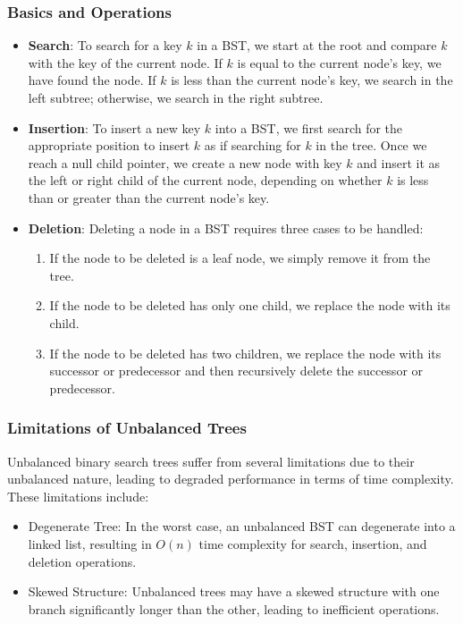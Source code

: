 \documentclass[12pt]{book} %
\begin{document}
\subsubsection{Basics and Operations}
\begin{itemize}
    \item \textbf{Search}: To search for a key \(k\) in a BST, we start at the root and compare \(k\) with the key of the current node. If \(k\) is equal to the current node's key, we have found the node. If \(k\) is less than the current node's key, we search in the left subtree; otherwise, we search in the right subtree.
    
    \item \textbf{Insertion}: To insert a new key \(k\) into a BST, we first search for the appropriate position to insert \(k\) as if searching for \(k\) in the tree. Once we reach a null child pointer, we create a new node with key \(k\) and insert it as the left or right child of the current node, depending on whether \(k\) is less than or greater than the current node's key.
    
    \item \textbf{Deletion}: Deleting a node in a BST requires three cases to be handled: 
        \begin{enumerate}
            \item If the node to be deleted is a leaf node, we simply remove it from the tree.
            \item If the node to be deleted has only one child, we replace the node with its child.
            \item If the node to be deleted has two children, we replace the node with its successor or predecessor and then recursively delete the successor or predecessor.
        \end{enumerate}
\end{itemize}

\subsubsection{Limitations of Unbalanced Trees}
Unbalanced binary search trees suffer from several limitations due to their unbalanced nature, leading to degraded performance in terms of time complexity. These limitations include:
\begin{itemize}
    \item Degenerate Tree: In the worst case, an unbalanced BST can degenerate into a linked list, resulting in \(O(n)\) time complexity for search, insertion, and deletion operations.
    \item Skewed Structure: Unbalanced trees may have a skewed structure with one branch significantly longer than the other, leading to inefficient operations.
\end{itemize}
\end{document}
